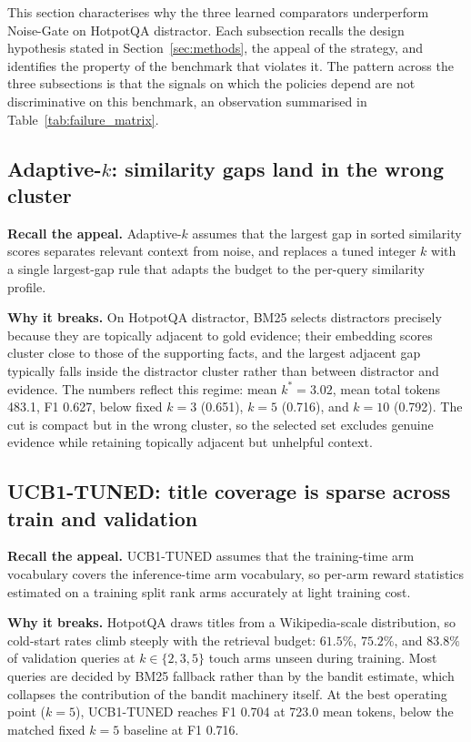 \documentclass[runningheads]{llncs}
\begin{document}
This section characterises why the three learned comparators underperform Noise-Gate on HotpotQA distractor. Each subsection recalls the design hypothesis stated in Section~\ref{sec:methods}, the appeal of the strategy, and identifies the property of the benchmark that violates it. The pattern across the three subsections is that the signals on which the policies depend are not discriminative on this benchmark, an observation summarised in Table~\ref{tab:failure_matrix}.

\subsection{Adaptive-$k$: similarity gaps land in the wrong cluster}
\label{subsec:fail_adaptivek}

\textbf{Recall the appeal.} Adaptive-$k$ assumes that the largest gap in sorted similarity scores separates relevant context from noise, and replaces a tuned integer $k$ with a single largest-gap rule that adapts the budget to the per-query similarity profile.

\textbf{Why it breaks.} On HotpotQA distractor, BM25 selects distractors precisely because they are topically adjacent to gold evidence; their embedding scores cluster close to those of the supporting facts, and the largest adjacent gap typically falls inside the distractor cluster rather than between distractor and evidence. The numbers reflect this regime: mean $k^*{=}3.02$, mean total tokens 483.1, F1 0.627, below fixed $k{=}3$ (0.651), $k{=}5$ (0.716), and $k{=}10$ (0.792). The cut is compact but in the wrong cluster, so the selected set excludes genuine evidence while retaining topically adjacent but unhelpful context.

\subsection{UCB1-TUNED: title coverage is sparse across train and validation}
\label{subsec:fail_ucb1}

\textbf{Recall the appeal.} UCB1-TUNED assumes that the training-time arm vocabulary covers the inference-time arm vocabulary, so per-arm reward statistics estimated on a training split rank arms accurately at light training cost.

\textbf{Why it breaks.} HotpotQA draws titles from a Wikipedia-scale distribution, so cold-start rates climb steeply with the retrieval budget: $61.5\%$, $75.2\%$, and $83.8\%$ of validation queries at $k\in\{2,3,5\}$ touch arms unseen during training. Most queries are decided by BM25 fallback rather than by the bandit estimate, which collapses the contribution of the bandit machinery itself. At the best operating point ($k{=}5$), UCB1-TUNED reaches F1 0.704 at 723.0 mean tokens, below the matched fixed $k{=}5$ baseline at F1 0.716.
\end{document}
